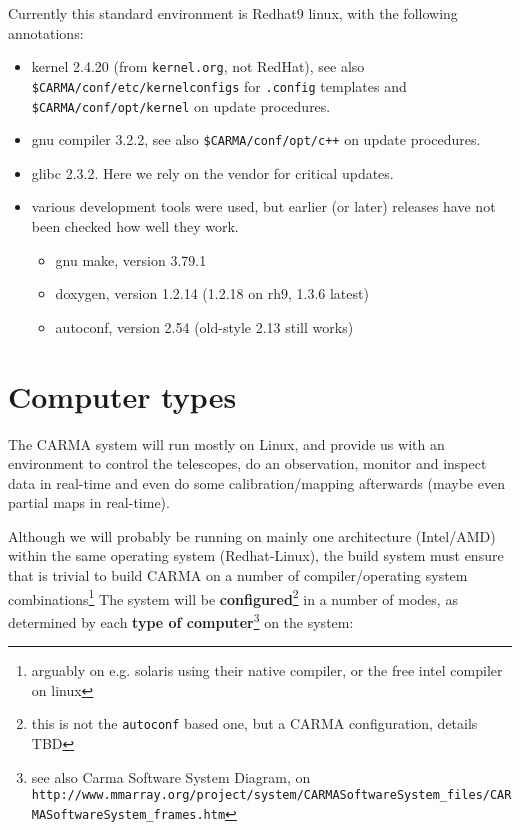\documentclass{article}
\begin{document}
Currently this standard environment
is Redhat9 linux, with the following annotations:

\begin{itemize}

\item
kernel 2.4.20 (from {\tt kernel.org}, not RedHat),
see also {\tt \$CARMA/conf/etc/kernelconfigs} 
for {\tt .config} templates 
and {\tt \$CARMA/conf/opt/kernel} 
on update procedures.

\item
gnu compiler 3.2.2,
see also {\tt \$CARMA/conf/opt/c++} 
on update procedures.

\item
glibc 2.3.2. Here we rely on the vendor for critical updates.

\item
various development tools were used, but earlier (or later) 
releases have not been checked how well they work.
\begin{itemize}
\item
gnu make, version 3.79.1
\item
doxygen, version 1.2.14 (1.2.18 on rh9, 1.3.6 latest)
\item autoconf, version 2.54 (old-style 2.13 still works)
\end{itemize}

\end{itemize}


\section{Computer types}


The CARMA system will run mostly on Linux, and provide us with an
environment to control the telescopes, do an observation, monitor and
inspect data in real-time and even do some calibration/mapping
afterwards (maybe even partial maps in real-time). 

Although we will probably be running on mainly one architecture (Intel/AMD) 
within the same operating system (Redhat-Linux), the build system must ensure
that is trivial to build CARMA on a number of compiler/operating system
combinations\footnote{arguably on e.g. solaris using their native compiler,
or the free intel compiler on linux}
The system will be {\bf configured}\footnote{this is not the {\tt autoconf}
based one, but a CARMA configuration, details TBD}
in a number of modes, as determined by 
each {\bf type of computer}\footnote{see also Carma Software System Diagram,
on\\ {\tt http://www.mmarray.org/project/system/CARMASoftwareSystem\_files/CARMASoftwareSystem\_frames.htm}}
on the system:
\end{document}
